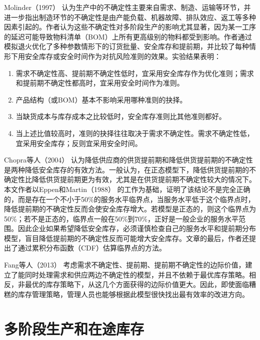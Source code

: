Molinder（1997） \cite{molinder_joint_1997} 认为生产中的不确定性主要来自需求、制造、运输等环节，并进一步指出制造环节的不确定性是由产能负载、机器故障、排队效应、返工等多种因素引起的。作者认为这些不确定性对多阶段生产的影响尤其显著，因为某一工序的延迟可能导致物料清单（BOM）上所有更高级别的物料都受到影响。作者通过模拟退火优化了多种参数情形下的订货批量、安全库存和提前期，并比较了每种情形下用安全库存或安全时间作为对抗风险准则的效果。实验结果表明：
\begin{enumerate}
\item
需求不确定性高、提前期不确定性低时，宜采用安全库存作为优化准则；需求和提前期不确定性都高时，宜采用安全时间作为准则。
\item
产品结构（或BOM）基本不影响采用哪种准则的抉择。
\item
当缺货成本与库存成本之比较低时，安全库存准则比其他准则都好。
\item
当上述比值较高时，准则的抉择往往取决于需求不确定性。需求不确定性低，宜采用安全库存；反则宜采用安全时间。
\end{enumerate}

Chopra等人（2004） \cite{chopra_effect_2004} 认为降低供应商的供货提前期和降低供货提前期的不确定性是两种降低安全库存的有效方法。一般认为，在正态模型下，降低供货提前期的不确定性比降低供货提前期更为有效，尤其是在供货提前期不确定性较大的情况下。本文作者以Eppen和Martin（1988） \cite{eppen_determining_1988} 的工作为基础，证明了该结论不是完全正确的，而是存在一个不小于50\%的服务水平临界点，当服务水平低于这个临界点时，降低提前期的不确定性反而会使安全库存增大。若模型是正态的，则这个临界点为50\%；若不是正态的，临界点一般在50\%到70\%，正好是一般企业的服务水平范围。因此企业如果希望降低安全库存，必须谨慎检查自己的服务水平和提前期分布模型，盲目降低提前期的不确定性反而可能增大安全库存。文章的最后，作者还提出了通过累积分布函数（CDF）估算临界点的方法。

Fang等人（2013） \cite{fang_decision_2013} 考虑需求不确定性、提前期、提前期不确定性的边际价值，建立了能同时处理需求和供应两边不确定性的模型，并且不依赖于最优库存策略。相反，非最优的库存策略下，从这几个方面获得的边际价值更大。因此，即使面临糟糕的库存管理策略，管理人员也能够根据此模型很快找出最有效率的改进方向。







\section{多阶段生产和在途库存}

